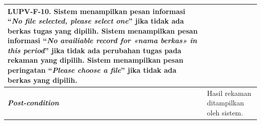\begin{longtable}{|L{3cm}|L{9cm}|}
                                      LUPV-F-10.  Sistem menampilkan pesan informasi ``\emph{No file selected, please
                                      select one}'' jika tidak ada berkas tugas yang dipilih. Sistem menampilkan pesan informasi ``\emph{No availiable record for
                                      «nama berkas» in this period}''  jika tidak ada perubahan tugas
                                      pada rekaman yang dipilih. Sistem menampilkan pesan peringatan ``\emph{Please choose
                                      a file}'' jika tidak ada berkas yang dipilih.\\\hline
  \textbf{\emph{Post-condition}} & Hasil rekaman ditampilkan oleh sistem. \\\hline
\end{longtable}

